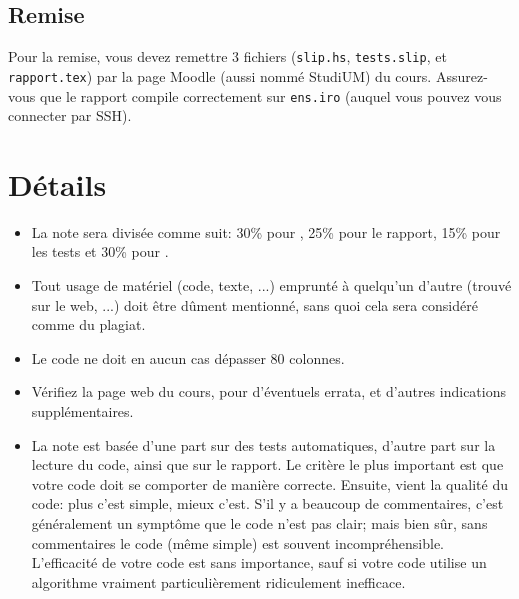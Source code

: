\documentclass{article}
\begin{document}
\subsection{Remise}

Pour la remise, vous devez remettre 3 fichiers (\texttt{slip.hs},
\texttt{tests.slip}, et \texttt{rapport.tex}) par la page Moodle (aussi
nommé StudiUM) du cours.  Assurez-vous que le rapport compile correctement
sur \texttt{ens.iro} (auquel vous pouvez vous connecter par SSH).

\section{Détails}

\begin{itemize}
\item La note sera divisée comme suit: 30\% pour , 25\% pour le
  rapport, 15\% pour les tests et 30\% pour .
\item Tout usage de matériel (code, texte, ...) emprunté à quelqu'un d'autre
  (trouvé sur le web, ...) doit être dûment mentionné, sans quoi cela sera
  considéré comme du plagiat.
\item Le code ne doit en aucun cas dépasser 80 colonnes.
\item Vérifiez la page web du cours, pour d'éventuels errata, et d'autres
  indications supplémentaires.
\item La note est basée d'une part sur des tests automatiques, d'autre part
  sur la lecture du code, ainsi que sur le rapport.  Le critère le plus
  important est que votre code doit se comporter de manière correcte.
  Ensuite, vient la qualité du code: plus c'est simple, mieux c'est.
  S'il y a beaucoup de commentaires, c'est généralement un symptôme que le
  code n'est pas clair; mais bien sûr, sans commentaires le code (même
  simple) est souvent incompréhensible.  L'efficacité de votre code est sans
  importance, sauf si votre code utilise un algorithme vraiment
  particulièrement ridiculement inefficace.
\end{itemize}
\end{document}
